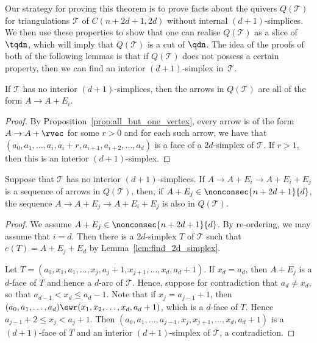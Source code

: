 Our strategy for proving this theorem is to prove facts about the quivers $Q(\mathcal{T})$ for triangulations $\mathcal{T}$ of $C(n + 2d + 1, 2d)$ without internal $(d + 1)$-simplices. We then use these properties to show that one can realise $Q(\mathcal{T})$ as a slice of $\tqdn$, which will imply that $Q(\mathcal{T})$ is a cut of $\qdn$. The idea of the proofs of both of the following lemmas is that if $Q(\mathcal{T})$ does not possess a certain property, then we can find an interior $(d + 1)$-simplex in~$\mathcal{T}$.

\begin{lemma}\label{lem:single-step-arrows}
If $\mathcal{T}$ has no interior $(d+1)$-simplices, then the arrows in $Q(\mathcal{T})$ are all of the form $A \rightarrow A + E_{i}$.
\end{lemma}
\begin{proof}
By Proposition~\ref{prop:all_but_one_vertex}, every arrow is of the form $A \rightarrow A + \rvec$ for some $r>0$ and for each such arrow, we have that $(a_{0}, a_{1}, \dots, a_{i}, a_{i} + r, a_{i+1}, a_{i + 2}, \dots, a_{d})$ is a face of a $2d$-simplex of $\mathcal{T}$. If $r>1$, then this is an interior $(d+1)$-simplex.
\end{proof}

\begin{lemma}\label{lem:simp_arrow_switch}
Suppose that $\mathcal{T}$ has no interior $(d+1)$-simplices. If $A \rightarrow A + E_{i} \rightarrow A + E_{i} + E_{j}$ is a sequence of arrows in $Q(\mathcal{T})$, then, if $A + E_{j} \in \nonconsec{n+2d+1}{d}$, the sequence $A \rightarrow A + E_{j} \rightarrow A + E_{i} + E_{j}$ is also in $Q(\mathcal{T})$.
\end{lemma}
\begin{proof}
We assume $A + E_{j} \in \nonconsec{n+2d+1}{d}$. By re-ordering, we may assume that $i = d$. Then there is a $2d$-simplex $T$ of $\mathcal{T}$ such that $e(T) = A + E_{j} + E_{d}$ by Lemma~\ref{lem:find_2d_simplex}.

Let $T = (a_{0}, x_{1}, a_{1}, \dots, x_{j}, a_{j} + 1, x_{j + 1}, \dots, x_{d}, a_{d} + 1)$. If $x_{d} = a_{d}$, then $A + E_{j}$ is a $d$-face of $T$ and hence a $d$-arc of $\mathcal{T}$. Hence, suppose for contradiction that $a_{d} \neq x_{d}$, so that $a_{d - 1} < x_{d} \leqslant a_{d} - 1$. Note that if $x_{j} = a_{j - 1} + 1$, then $(a_{0}, a_{1}, \dots , a_{d}) \swr (x_{1}, x_{2}, \dots ,x_{d}, a_{d} + 1)$, which is a $d$-face of $T$. Hence $a_{j - 1} + 2 \leqslant x_{j} < a_{j} + 1$. Then $(a_{0}, a_{1}, \dots, a_{j - 1}, x_{j}, x_{j + 1}, \dots , x_{d}, a_{d} + 1)$ is a $(d + 1)$-face of $T$ and an interior $(d+1)$-simplex of $\mathcal{T}$, a contradiction.
\end{proof}
